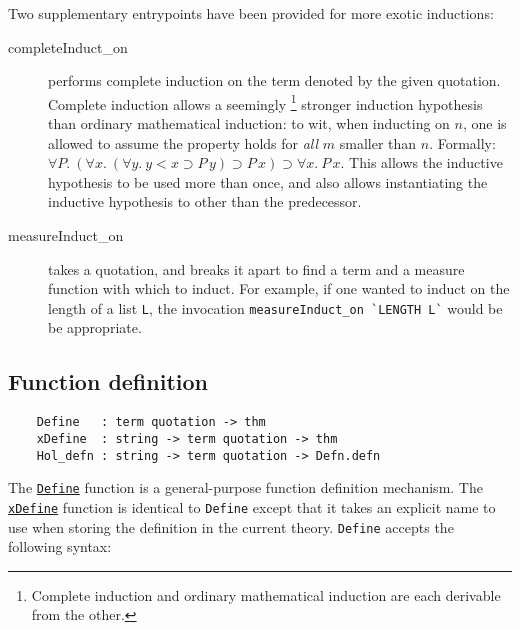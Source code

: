 Two supplementary entrypoints have been provided for more exotic
inductions:
\begin{description}
\item [completeInduct\_on] performs complete
induction on the term denoted by the given quotation. Complete induction
allows a seemingly \footnote{Complete
induction and ordinary mathematical induction are each derivable from
the other.} stronger induction hypothesis than ordinary mathematical
induction: to wit, when inducting on
$n$, one is allowed to assume the property holds for {\it all\/} $m$
smaller than $n$. Formally: $\forall P.\ (\forall x.\ (\forall y.\ y < x
\supset P\, y) \supset P\,x) \supset \forall x.\ P\,x$. This allows the
inductive hypothesis to be used more than once, and also allows
instantiating the inductive hypothesis to other than the predecessor.

\item [measureInduct\_on] takes a quotation, and breaks it apart
to find a term and a measure function with which to induct. For
example, if one wanted to induct on the length of a list \verb+L+, the
invocation {\small\verb+measureInduct_on `LENGTH L`+} would be be
appropriate.

\end{description}

\subsection{Function definition}

\begin{verbatim}
    Define   : term quotation -> thm
    xDefine  : string -> term quotation -> thm
    Hol_defn : string -> term quotation -> Defn.defn
\end{verbatim}

The \underline{\tt Define} function is a general-purpose function definition
mechanism. The \underline{\tt xDefine} function is identical to
{\small\verb+Define+} except that it takes an explicit name to use when
storing the definition in the current theory. {\small\tt Define}
accepts the following syntax:


